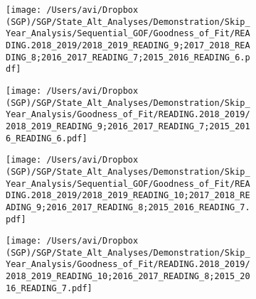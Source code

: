 \documentclass[12pt]{article}
\begin{document}
\begin{figure}[H]
\caption*{{{\bf{Figure A7:}} } Sequential (left) and skip-year (right) fit plots for Reading (grades 9 - 10)}
  \begin{subfigure}[b]{0.5\textwidth}
    \texttt{[image: /Users/avi/Dropbox (SGP)/SGP/State\_Alt\_Analyses/Demonstration/Skip\_Year\_Analysis/Sequential\_GOF/Goodness\_of\_Fit/READING.2018\_2019/2018\_2019\_READING\_9;2017\_2018\_READING\_8;2016\_2017\_READING\_7;2015\_2016\_READING\_6.pdf]}
  \end{subfigure}
  \begin{subfigure}[b]{0.5\textwidth}
    \texttt{[image: /Users/avi/Dropbox (SGP)/SGP/State\_Alt\_Analyses/Demonstration/Skip\_Year\_Analysis/Goodness\_of\_Fit/READING.2018\_2019/2018\_2019\_READING\_9;2016\_2017\_READING\_7;2015\_2016\_READING\_6.pdf]}
  \end{subfigure}
  \begin{subfigure}[b]{0.5\textwidth}
    \texttt{[image: /Users/avi/Dropbox (SGP)/SGP/State\_Alt\_Analyses/Demonstration/Skip\_Year\_Analysis/Sequential\_GOF/Goodness\_of\_Fit/READING.2018\_2019/2018\_2019\_READING\_10;2017\_2018\_READING\_9;2016\_2017\_READING\_8;2015\_2016\_READING\_7.pdf]}
  \end{subfigure}
  \begin{subfigure}[b]{0.5\textwidth}
    \texttt{[image: /Users/avi/Dropbox (SGP)/SGP/State\_Alt\_Analyses/Demonstration/Skip\_Year\_Analysis/Goodness\_of\_Fit/READING.2018\_2019/2018\_2019\_READING\_10;2016\_2017\_READING\_8;2015\_2016\_READING\_7.pdf]}
  \end{subfigure}
\end{figure}



\end{document}
